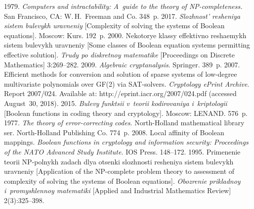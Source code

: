   \begin{multicols}{2}

\renewcommand{\bibname}{\protect\rmfamily References}

{\small\frenchspacing
 {%
 \begin{thebibliography}{99}
 1979. \textit{Computers and intractability: 
A~guide to the theory of NP-completeness.} San Francisco, CA: W.\,H.~Freeman and Co. 348~p.
 2017. \textit{Slozhnost' re\-she\-niya 
sistem bulevykh uravneniy} [Complexity of solving the systems of 
Boolean equations]. Moscow: Kurs. 192~p.
 2000. Nekotorye klassy effektivno reshaemykh 
sistem bulevykh uravneniy [Some classes of Boolean equation systems 
permitting effective solution]. 
\textit{Trudy po diskretnoy matematike} [Proceedings on Discrete Mathematics] 3:269--282.
 2009. \textit{Algebraic cryptanalysis}. Springer. 389~p.
 2007. 
Efficient methods for conversion and solution of sparse systems of 
low-degree multivariate polynomials over GF(2) via SAT-solvers. 
\textit{Cryptology ePrint Archive}. Report 2007/024. Available at: 
{\sf http://eprint.iacr.org/2007/024.pdf} (accessed August~30, 2018).
2015. \textit{Bulevy funktsii v~teorii kodirovaniya i~kriptologii} 
[Boolean functions in coding theory and cryptology]. Moscow: LENAND. 576~p.
 1977. 
\textit{The theory of error-correcting codes}. 
North-Holland mathematical library ser.
North-Holland Publishing Co. 774~p.
 2008. 
Local affinity of Boolean mappings. 
\textit{Boolean functions in cryptology and information security: 
Proceedings of the NATO Advanced Study Institute.} IOS Press. 148--172.
 1995. Primenenie teorii NP-polnykh zadach 
dlya otsenki slozhnosti resheniya sistem bulevykh uravneniy 
[Application of the NP-complete problem theory to assessment 
of complexity of solving the systems of Boolean equations]. 
\textit{Obozrenie prikladnoy i~promyshlennoy matematiki} 
[Applied and Industrial Mathematics Review] 2(3):325--398.

\end{thebibliography}}}
\end{multicols}
